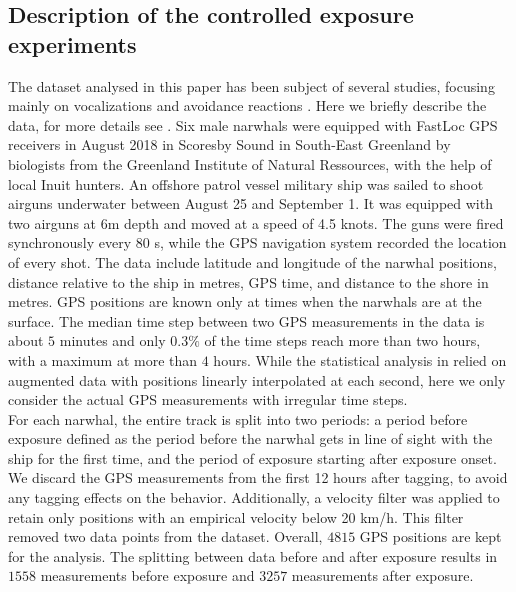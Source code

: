 \documentclass[aoas]{imsart}
\theoremstyle{definition}
\theoremstyle{remark}
\theoremstyle{remark}
\newcommand {\1}{\mathbb{1}}
\begin{document}
\subsection{Description of the controlled exposure experiments}
\label{subsection: data description}
The dataset analysed in this paper has been subject of several studies, focusing mainly on vocalizations and avoidance reactions \citep{heide-jorgensen_behavioral_2021,tervo_narwhals_2021,tervo_stuck_2023}. 
Here we briefly describe the data, for more details see \citep{heide-jorgensen_behavioral_2021}. 
Six male narwhals were equipped with FastLoc GPS receivers in August 2018 in Scoresby Sound in South-East Greenland by biologists from the Greenland Institute of Natural Ressources, with the help of local Inuit hunters. 
An offshore patrol vessel military ship was sailed to shoot airguns underwater between August 25 and September 1. It was equipped with two airguns at 6m depth and moved at a speed of 4.5 knots. The guns were fired synchronously every $80$ s, while the GPS navigation system recorded the location of every shot. 
The data include latitude and longitude of the narwhal positions, distance relative to the ship in metres, GPS time, and distance to the shore in metres. GPS positions are known only at times when the narwhals are at the surface. The median time step between two GPS measurements in the data is about $5$ minutes and only $0.3 \%$ of the time steps reach more than two hours, with a maximum at more than $4$ hours. While the statistical analysis in \citep{heide-jorgensen_behavioral_2021} relied on augmented data with positions linearly interpolated at each second, here we only consider the actual GPS measurements with irregular time steps.\\




For each narwhal, the entire track is split into two periods: a period before exposure defined as the period before the narwhal gets in line of sight with the ship for the first time, and the period of exposure starting after exposure onset. We discard the GPS measurements from the first 12 hours after tagging, to avoid any tagging effects on the behavior. Additionally, a velocity filter was applied to retain only positions with an empirical velocity below 20 km/h. This filter removed two data points from the dataset.
Overall, $4815$ GPS positions are kept for the analysis. The splitting between data before and after exposure results in $1558$ measurements before exposure and $3257$ measurements after exposure.
\end{document}
